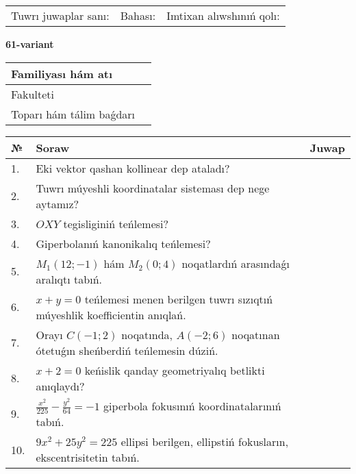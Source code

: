 \documentclass{article}
\begin{document}
\vspace{1cm}

\begin{tabular}{lll}
Tuwrı juwaplar sanı: \underline{\hspace{1.5cm}} & 
Bahası: \underline{\hspace{1.5cm}} & 
Imtixan alıwshınıń qolı: \underline{\hspace{2cm}} \\
\end{tabular}

\egroup

\newpage


\textbf{61-variant}\\

\bgroup
\def\arraystretch{1.6} %

\begin{tabular}{|m{5.7cm}|m{9.5cm}|}
\hline
Familiyası hám atı & \\
\hline
Fakulteti  & \\
\hline
Toparı hám tálim baǵdarı  & \\
\hline
\end{tabular}

\vspace{1cm}

\begin{tabular}{|m{0.7cm}|m{10cm}|m{4cm}|}
\hline
№ & Soraw & Juwap \\
\hline
1. & Eki vektor qashan kollinear dep ataladı? &  \\
\hline
2. & Tuwrı múyeshli koordinatalar sisteması dep nege aytamız? &  \\
\hline
3. & $OXY$ tegisliginiń teńlemesi? &  \\
\hline
4. & Giperbolanıń kanonikalıq teńlemesi? &  \\
\hline
5. & $M_{1} (12;-1)$ hám $M_{2} (0;4)$ noqatlardıń arasındaǵı aralıqtı tabıń. &  \\
\hline
6. & $x+y=0$ teńlemesi menen berilgen tuwrı sızıqtıń múyeshlik koefficientin anıqlań. &  \\
\hline
7. & Orayı $C (-1;2)$ noqatında, $A (-2;6 )$ noqatınan ótetuǵın sheńberdiń teńlemesin dúziń. &  \\
\hline
8. & $x+2=0$ keńislik qanday geometriyalıq betlikti anıqlaydı? &  \\
\hline
9. & $\frac{x^{2}}{225}-\frac{y^{2}}{64}=-1$ giperbola fokusınıń koordinatalarınıń tabıń. &  \\
\hline
10. & $9x^{2}+25y^{2}=225$ ellipsi berilgen, ellipstiń fokusların, ekscentrisitetin tabıń. &  \\
\hline
\end{tabular}
\end{document}

